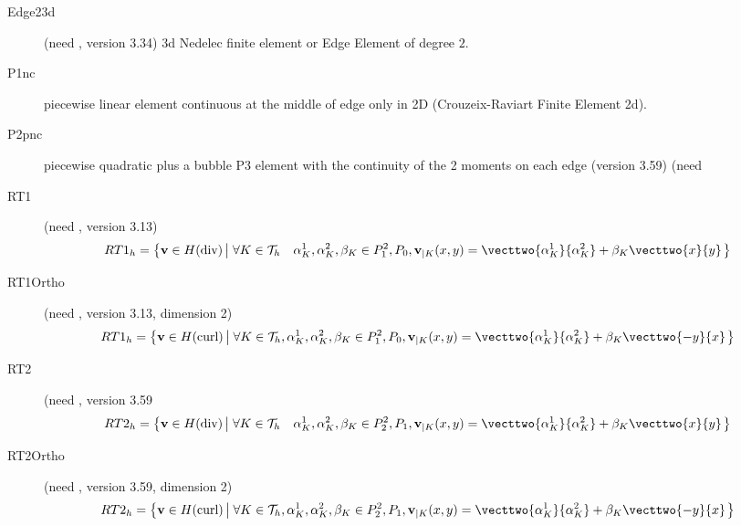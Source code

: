 \documentclass[a4paper,twoside,12pt]{book}
\begin{document}
\begin{description}
      \item[Edge23d]  (need , version 3.34) 3d Nedelec finite element or Edge  Element of degree $2$. 

      
     \item[P1nc]  piecewise linear   element continuous at
     the middle of edge only in 2D (Crouzeix-Raviart Finite Element 2d).
     
         \item[P2pnc]  piecewise quadratic plus  a bubble  P3    element with the 
     continuity of  the 2 moments on each edge (version 3.59)   (need 
 
    \item[RT1]  (need , version 3.13)
     \begin{equation}
         RT1_{h} = \left\{ \mathbf{v} \in H(\textrm{div}) \left|\; \forall K \in
         \mathcal{T}_{h} \quad  \alpha^1_{K}, \alpha^2_{K}, \beta_{K} \in P_1^2,P_0,  \mathbf{v}_{|K}(x,y) = 
         \vecttwo{\alpha^1_{K}}{\alpha^2_{K}} + \beta_{K}\vecttwo{x}{y}   \right.\right\}
         \label{eq:RT1}
     \end{equation}
    \item[RT1Ortho]  (need , version 3.13, dimension 2)
         \begin{equation}
         RT1_{h} = \left\{ \mathbf{v} \in H(\textrm{curl}) \left|\; \forall K \in
         \mathcal{T}_{h},  \alpha^1_{K}, \alpha^2_{K}, \beta_{K} \in P_1^2,P_0,  \mathbf{v}_{|K}(x,y) = 
         \vecttwo{\alpha^1_{K}}{\alpha^2_{K}} + \beta_{K}\vecttwo{-y}{x}   \right.\right\}
         \label{eq:RT1Ortho}
     \end{equation}
     
       \item[RT2]  (need , version 3.59
     \begin{equation}
         RT2_{h} = \left\{ \mathbf{v} \in H(\textrm{div}) \left|\; \forall K \in
         \mathcal{T}_{h} \quad   \alpha^1_{K}, \alpha^2_{K}, \beta_{K} \in P_2^2, P_1,  \mathbf{v}_{|K}(x,y) = 
         \vecttwo{\alpha^1_{K}}{\alpha^2_{K}} + \beta_{K}\vecttwo{x}{y}   \right.\right\}
         \label{eq:RT2}
     \end{equation}
   \item[RT2Ortho]  (need , version 3.59, dimension 2)
         \begin{equation}
         RT2_{h} = \left\{ \mathbf{v} \in H(\textrm{curl}) \left|\; \forall K \in
         \mathcal{T}_{h} ,  \alpha^1_{K}, \alpha^2_{K}, \beta_{K} \in P_2^2, P_1,  \mathbf{v}_{|K}(x,y) = 
         \vecttwo{\alpha^1_{K}}{\alpha^2_{K}} + \beta_{K}\vecttwo{-y}{x}   \right.\right\}
         \label{eq:RT1Ortho}
     \end{equation}
    



\end{description}
\end{document}
